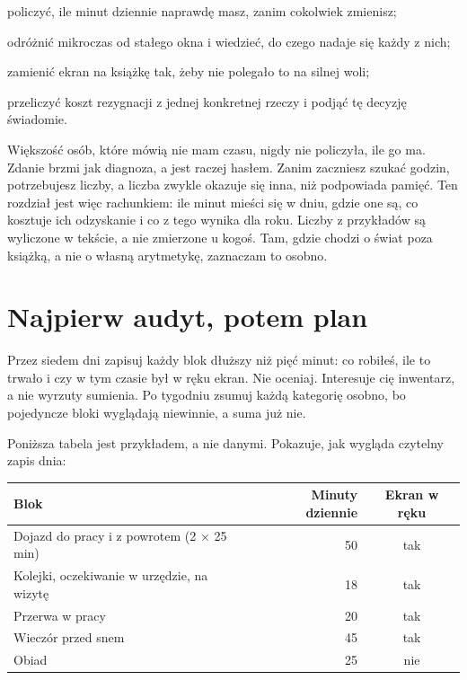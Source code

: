 
\begin{cele}
\item policzyć, ile minut dziennie naprawdę masz, zanim cokolwiek zmienisz;
\item odróżnić mikroczas od stałego okna i wiedzieć, do czego nadaje się każdy z nich;
\item zamienić ekran na książkę tak, żeby nie polegało to na silnej woli;
\item przeliczyć koszt rezygnacji z jednej konkretnej rzeczy i podjąć tę decyzję świadomie.
\end{cele}

Większość osób, które mówią \glqq nie mam czasu\grqq{}, nigdy nie policzyła, ile go ma.
Zdanie brzmi jak diagnoza, a jest raczej hasłem. Zanim zaczniesz szukać godzin, potrzebujesz
liczby, a liczba zwykle okazuje się inna, niż podpowiada pamięć. Ten rozdział jest więc
rachunkiem: ile minut mieści się w dniu, gdzie one są, co kosztuje ich odzyskanie i co
z tego wynika dla roku. Liczby z przykładów są wyliczone w tekście, a nie zmierzone u kogoś.
Tam, gdzie chodzi o świat poza książką, a nie o własną arytmetykę, zaznaczam to osobno.

\section{Najpierw audyt, potem plan}

Przez siedem dni zapisuj każdy blok dłuższy niż pięć minut: co robiłeś, ile to trwało i czy
w tym czasie był w ręku ekran. Nie oceniaj. Interesuje cię inwentarz, a nie wyrzuty sumienia.
Po tygodniu zsumuj każdą kategorię osobno, bo pojedyncze bloki wyglądają niewinnie, a suma już nie.

Poniższa tabela jest przykładem, a nie danymi. Pokazuje, jak wygląda czytelny zapis dnia:

\begin{center}
\begin{tabular}{lrc}
\toprule
Blok & Minuty dziennie & Ekran w ręku \\
\midrule
Dojazd do pracy i z powrotem (2 $\times$ 25 min) & 50 & tak \\
Kolejki, oczekiwanie w urzędzie, na wizytę & 18 & tak \\
Przerwa w pracy & 20 & tak \\
Wieczór przed snem & 45 & tak \\
Obiad & 25 & nie \\
\bottomrule
\end{tabular}
\end{center}

